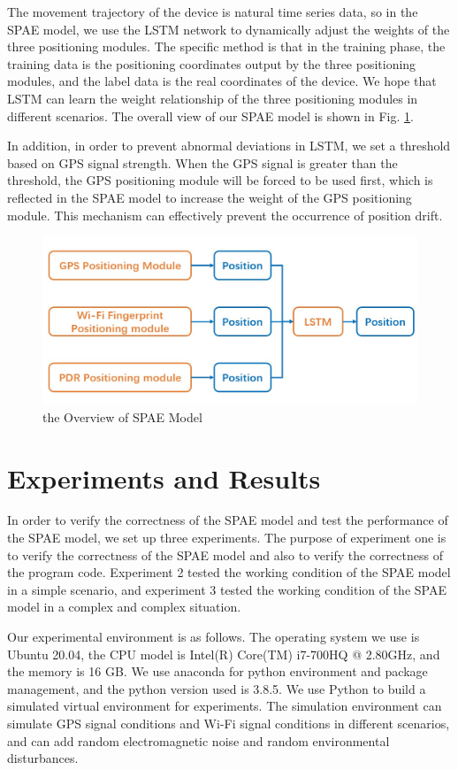 \documentclass[conference]{IEEEtran}
\begin{document}
The movement trajectory of the device is natural time series data, so in the SPAE model, we use the LSTM network to dynamically adjust the weights of the three positioning modules. The specific method is that in the training phase, the training data is the positioning coordinates output by the three positioning modules, and the label data is the real coordinates of the device. We hope that LSTM can learn the weight relationship of the three positioning modules in different scenarios. The overall view of our SPAE model is shown in Fig. \ref{fig:spae}.

In addition, in order to prevent abnormal deviations in LSTM, we set a threshold based on GPS signal strength. When the GPS signal is greater than the threshold, the GPS positioning module will be forced to be used first, which is reflected in the SPAE model to increase the weight of the GPS positioning module. This mechanism can effectively prevent the occurrence of position drift.

\begin{figure}[h]
	\centering
	\includegraphics[scale=0.3]{./figures/spae.jpg}
	\caption{the Overview of SPAE Model}
	\label{fig:spae}
\end{figure}

\section{Experiments and Results}
In order to verify the correctness of the SPAE model and test the performance of the SPAE model, we set up three experiments. The purpose of experiment one is to verify the correctness of the SPAE model and also to verify the correctness of the program code. Experiment 2 tested the working condition of the SPAE model in a simple scenario, and experiment 3 tested the working condition of the SPAE model in a complex and complex situation.

Our experimental environment is as follows. The operating system we use is Ubuntu 20.04, the CPU model is Intel(R) Core(TM) i7-700HQ @ 2.80GHz, and the memory is 16 GB. We use anaconda for python environment and package management, and the python version used is 3.8.5. We use Python to build a simulated virtual environment for experiments. The simulation environment can simulate GPS signal conditions and Wi-Fi signal conditions in different scenarios, and can add random electromagnetic noise and random environmental disturbances.
\end{document}
